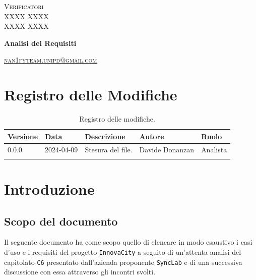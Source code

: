 \documentclass[8pt]{article}
\begin{document}
\begin{titlepage}
\begin{minipage}[t]{0.47\textwidth}
		{\large{\textsc{Verificatori}}
			\vspace{3mm}
			{\\\large{\textsc{XXXX XXXX}\\}} %
			{\large{\textsc{XXXX XXXX}}}
			
		}
		\vspace{4mm}\vspace{4mm}
	\end{minipage}
	\vspace{4cm}
	\begin{center}
		\begin{flushright}
			{\fontsize{30pt}{52pt}\selectfont \textbf{Analisi dei Requisiti\\}} %
		\end{flushright}
		\vspace{3cm}
	\end{center}
	\vspace{8 cm}
	{\small \textsc{\href{mailto: nan1fyteam.unipd@gmail.com}{nan1fyteam.unipd@gmail.com}}}
\end{titlepage}
\pagestyle{mystyle}
\section*{Registro delle Modifiche}
\begin{table}[ht!]	
	\centering
	\begin{tabular}{p{1.2cm} p{2cm} p{6cm} p{3cm} p{2cm}}
		\toprule
		\textbf{Versione}& \textbf{Data} & \textbf{Descrizione} & \textbf{Autore} & \textbf{Ruolo} \\
		\midrule
		0.0.0 & 2024-04-09 & Stesura del file. & Davide Donanzan &
		Analista \\\\ %
		\bottomrule
	\end{tabular}
	\caption{Registro delle modifiche.}
	\label{table:Registro delle modifiche}
\end{table}
\newpage
\tableofcontents
\clearpage
\newpage
\justifying
\section{Introduzione}
\subsection{Scopo del documento}
Il seguente documento ha come scopo quello di elencare in modo esaustivo i casi d'uso e i requisiti del progetto \texttt{InnovaCity} a seguito di un'attenta analisi del capitolato \texttt{C6} presentato dall'azienda proponente \texttt{SyncLab} e di una successiva discussione con essa attraverso gli incontri svolti.
\end{document}
